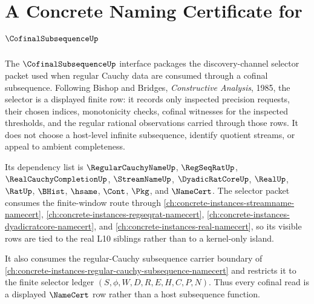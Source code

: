 \chapter{A Concrete Naming Certificate for $\CofinalSubsequenceUp$}
\label{ch:concrete-instances-cofinalsubsequence-namecert}

The $\CofinalSubsequenceUp$ interface packages the discovery-channel selector packet used when regular Cauchy data are consumed through a cofinal subsequence. Following Bishop and Bridges, \emph{Constructive Analysis}, 1985, the selector is a displayed finite row: it records only inspected precision requests, their chosen indices, monotonicity checks, cofinal witnesses for the inspected thresholds, and the regular rational observations carried through those rows. It does not choose a host-level infinite subsequence, identify quotient streams, or appeal to ambient completeness.

Its dependency list is $\RegularCauchyNameUp$, $\RegSeqRatUp$, $\RealCauchyCompletionUp$, $\StreamNameUp$, $\DyadicRatCoreUp$, $\RealUp$, $\RatUp$, $\BHist$, $\hsame$, $\Cont$, $\Pkg$, and $\NameCert$.
The selector packet consumes the finite-window route through \autoref{ch:concrete-instances-streamname-namecert}, \autoref{ch:concrete-instances-regseqrat-namecert}, \autoref{ch:concrete-instances-dyadicratcore-namecert}, and \autoref{ch:concrete-instances-real-namecert}, so its visible rows are tied to the real L10 siblings rather than to a kernel-only island.

It also consumes the regular-Cauchy subsequence carrier boundary of \autoref{ch:concrete-instances-regular-cauchy-subsequence-namecert} and restricts it to the finite selector ledger $(S,\phi,W,D,R,E,H,C,P,N)$. Thus every cofinal read is a displayed $\NameCert$ row rather than a host subsequence function.

